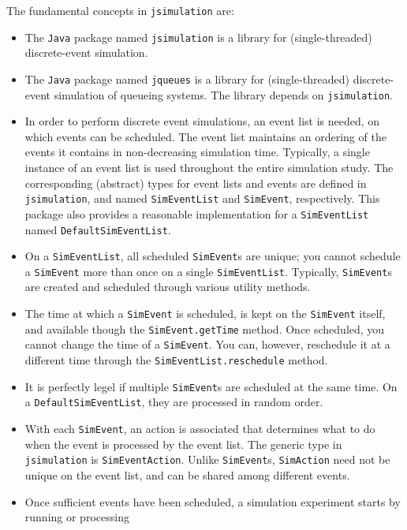 The fundamental concepts in
\lstinline|jsimulation| are:
\begin{itemize}
\item The \lstinline|Java| package named \lstinline|jsimulation|
  is a library for (single-threaded) discrete-event simulation.
\item The \lstinline|Java| package named \lstinline|jqueues|
  is a library for (single-threaded) discrete-event simulation
  of queueing systems.
  The library depends on \lstinline|jsimulation|.
\item In order to perform discrete event simulations,
  an event list is needed, on which events can be scheduled.
  The event list maintains an ordering of the events it contains
  in non-decreasing simulation time.
  Typically, a single instance of an event list is used
  throughout the entire simulation study.
  The corresponding (abstract) types
  for event lists and events are defined in \lstinline|jsimulation|,
  and named \lstinline|SimEventList| and \lstinline|SimEvent|, respectively.
  This package also provides a reasonable implementation for
  a \lstinline|SimEventList| named \lstinline|DefaultSimEventList|.
\item On a \lstinline|SimEventList|, all scheduled \lstinline|SimEvent|s are
  unique; you cannot schedule a \lstinline|SimEvent| more than once
  on a single \lstinline|SimEventList|.
  Typically, \lstinline|SimEvent|s are created and scheduled through
  various utility methods.
\item The time at which a \lstinline|SimEvent| is scheduled,
  is kept on the \lstinline|SimEvent| itself,
  and available though the \lstinline|SimEvent.getTime| method.
  Once scheduled, you cannot change the time of a \lstinline|SimEvent|.
  You can, however, reschedule it at a different time
  through the \lstinline|SimEventList.reschedule| method.
\item It is perfectly legel if multiple \lstinline|SimEvent|s are scheduled
  at the same time.
  On a \lstinline|DefaultSimEventList|, they are processed in random order.
\item With each \lstinline|SimEvent|, an action is associated that determines
  what to do when the event is processed by the event list.
  The generic type in \lstinline|jsimulation| is \lstinline|SimEventAction|.
  Unlike \lstinline|SimEvent|s, \lstinline|SimAction| need not be unique
  on the event list, and can be shared among different events.
\item Once sufficient events have been scheduled,
  a simulation experiment starts by running or processing

\end{itemize}
